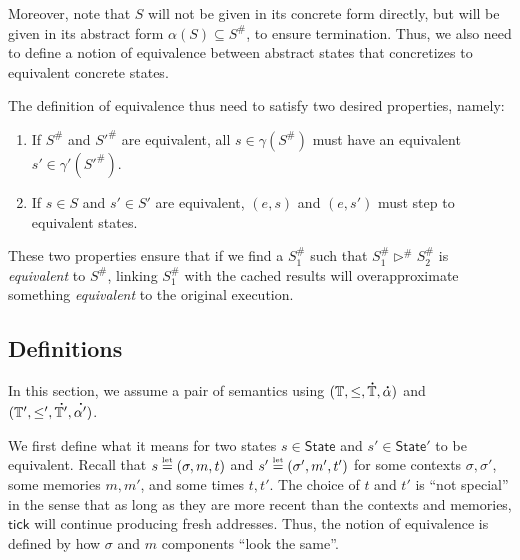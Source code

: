 \documentclass[acmsmall,screen,review]{acmart}\settopmatter{printfolios=true,printccs=false,printacmref=false}
\theoremstyle{acmdefinition}
\newcommand*{\A}[1]{\overset{\,_{\mbox{\Large .}}}{#1}}
\newcommand*{\Abs}[1]{{#1}^{\#}}
\newcommand*{\Time}{\mathbb{T}}
\newcommand*{\ATime}{\A{\Time}}
\newcommand*{\ctx}{\sigma}
\newcommand*{\mem}{m}
\newcommand*{\texteq}[1]{\stackrel{\mathclap{\tiny\normalfont\mbox{#1}}}{=}}
\newcommand*{\State}{\mathsf{State}}
\newcommand*{\tick}{\mathsf{tick}}
\begin{document}
Moreover, note that $S$ will not be given in its concrete form directly, but will be given in its abstract form $\alpha(S)\subseteq\Abs{S}$, to ensure termination.
Thus, we also need to define a notion of equivalence between abstract states that concretizes to equivalent concrete states.

The definition of equivalence thus need to satisfy two desired properties, namely:
\begin{enumerate}
  \item If $\Abs{S}$ and $\Abs{S'}$ are equivalent, all $s\in\gamma(\Abs{S})$ must have an equivalent $s'\in\gamma'(\Abs{S'})$.
  \item If $s\in S$ and $s'\in S'$ are equivalent, $(e,s)$ and $(e,s')$ must step to equivalent states.
\end{enumerate}
These two properties ensure that if we find a $\Abs{S}_1$ such that ${\Abs{S}_1}\Abs\rhd{\Abs{S}_2}$ is \emph{equivalent} to $\Abs{S}$, linking $\Abs{S}_1$ with the cached results will overapproximate something \emph{equivalent} to the original execution.

\subsection{Definitions}
In this section, we assume a pair of semantics using $(\Time,\le,\ATime,\A\alpha)$ and $(\Time',\le',\A{\Time'},\A{\alpha'})$.

We first define what it means for two states $s\in\State$ and $s'\in\State'$ to be equivalent.
Recall that $s\texteq{let}(\ctx,\mem,t)$ and $s'\texteq{let}(\ctx',\mem',t')$ for some contexts $\ctx,\ctx'$, some memories $\mem,\mem'$, and some times $t,t'$.
The choice of $t$ and $t'$ is ``not special'' in the sense that as long as they are more recent than the contexts and memories, $\tick$ will continue producing fresh addresses.
Thus, the notion of equivalence is defined by how $\ctx$ and $\mem$ components ``look the same''.
\end{document}

